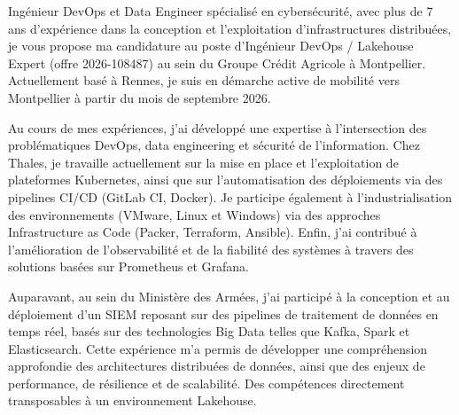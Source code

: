 \documentclass{article}
\begin{document}

Ingénieur DevOps et Data Engineer spécialisé en cybersécurité, avec plus de 7 ans d’expérience dans la conception et l’exploitation d’infrastructures distribuées, je vous propose ma candidature au poste d’Ingénieur DevOps / Lakehouse Expert (offre 2026-108487) au sein du Groupe Crédit Agricole à Montpellier. Actuellement basé à Rennes, je suis en démarche active de mobilité vers Montpellier à partir du mois de septembre 2026. %


Au cours de mes expériences, j’ai développé une expertise à l’intersection des problématiques DevOps, data engineering et sécurité de l’information. Chez Thales, je travaille actuellement sur la mise en place et l’exploitation de plateformes Kubernetes, ainsi que sur l’automatisation des déploiements via des pipelines CI/CD (GitLab CI, Docker). Je participe également à l’industrialisation des environnements (VMware, Linux et Windows) via des approches Infrastructure as Code (Packer, Terraform, Ansible). Enfin, j’ai contribué à l’amélioration de l’observabilité et de la fiabilité des systèmes à travers des solutions basées sur Prometheus et Grafana. %

Auparavant, au sein du Ministère des Armées, j’ai participé à la conception et au déploiement d’un SIEM reposant sur des pipelines de traitement de données en temps réel, basés sur des technologies Big Data telles que Kafka, Spark et Elasticsearch. Cette expérience m’a permis de développer une compréhension approfondie des architectures distribuées de données, ainsi que des enjeux de performance, de résilience et de scalabilité. Des compétences directement transposables à un environnement Lakehouse. %
\end{document}
